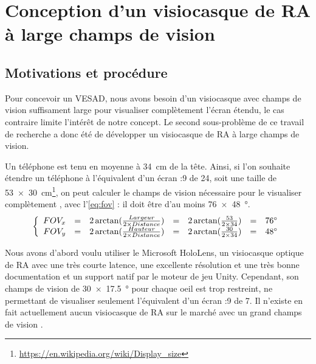 \chapter{Conception d'un visiocasque de RA à large champs de vision}
\label{ch:methodology}

\section{Motivations et procédure}
Pour concevoir un VESAD, nous avons besoin d'un visiocasque avec champs de vision suffisament large pour visualiser complètement l'écran étendu, le cas contraire limite l'intérêt de notre concept. Le second sous-problème de ce travail de recherche a donc été de développer un visiocasque de RA à large champs de vision.

Un téléphone est tenu en moyenne à \SI{34}{\cm} \citep{Bababekova2011} de la tête. Ainsi, si l'on souhaite étendre un téléphone à l'équivalent d'un écran {:9} de \SI{24}{\inch}, soit une taille de \SI{53x30}{\cm}\footnote{\url{https://en.wikipedia.org/wiki/Display_size}}, on peut calculer le champs de vision nécessaire pour le visualiser complètement , avec l'\autoref{eq:fov} : il doit être d'au moins \SI{76x48}{\degree}.
\begin{equation}
  \label{eq:fov}
  \left \{
  \begin{array}{r c c c c c l}
    FOV_x & = & 2 \arctan (\frac{Largeur}{2 \times Distance}) & = & 2 \arctan (\frac{53}{2 \times 34}) & = & \ang{76}\\
    FOV_y & = & 2 \arctan (\frac{Hauteur}{2 \times Distance}) & = & 2 \arctan (\frac{30}{2 \times 34}) & = & \ang{48}
  \end{array}
  \right .
\end{equation}


Nous avons d'abord voulu utiliser le Microsoft HoloLens, un visiocasque optique de RA avec une très courte latence, une excellente résolution et une très bonne documentation et un support natif par le moteur de jeu Unity. Cependant, son champs de vision de \SI{30x17.5}{\degree} pour chaque oeil \citep{Kreylos2015} est trop restreint, ne permettant de visualiser seulement l'équivalent d'un écran {:9} de \SI{7}{\inch}. Il n'existe en fait actuellement aucun visiocasque de RA sur le marché  avec un grand champs de vision \citep{Millette2016}.

